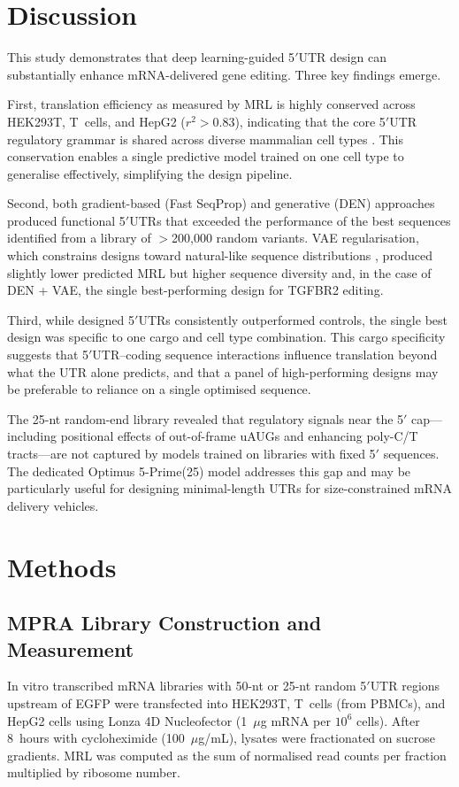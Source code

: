 \documentclass[11pt]{article}
\begin{document}
\section{Discussion}

This study demonstrates that deep learning-guided 5$'$UTR design can substantially enhance mRNA-delivered gene editing. Three key findings emerge.

First, translation efficiency as measured by MRL is highly conserved across HEK293T, T~cells, and HepG2 ($r^2 > 0.83$), indicating that the core 5$'$UTR regulatory grammar is shared across diverse mammalian cell types \citep{leppek2018functional, jackson2010mechanism}. This conservation enables a single predictive model trained on one cell type to generalise effectively, simplifying the design pipeline.

Second, both gradient-based (Fast SeqProp) and generative (DEN) approaches \citep{linder2020fast, bogdanovich2019deep} produced functional 5$'$UTRs that exceeded the performance of the best sequences identified from a library of $>$200,000 random variants. VAE regularisation, which constrains designs toward natural-like sequence distributions \citep{kingma2014auto}, produced slightly lower predicted MRL but higher sequence diversity and, in the case of DEN + VAE, the single best-performing design for TGFBR2 editing.

Third, while designed 5$'$UTRs consistently outperformed controls, the single best design was specific to one cargo and cell type combination. This cargo specificity suggests that 5$'$UTR--coding sequence interactions \citep{hinnebusch2014molecular} influence translation beyond what the UTR alone predicts, and that a panel of high-performing designs may be preferable to reliance on a single optimised sequence.

The 25-nt random-end library revealed that regulatory signals near the 5$'$ cap---including positional effects of out-of-frame uAUGs and enhancing poly-C/T tracts---are not captured by models trained on libraries with fixed 5$'$ sequences. The dedicated Optimus 5-Prime(25) model addresses this gap and may be particularly useful for designing minimal-length UTRs for size-constrained mRNA delivery vehicles.

\section{Methods}

\subsection{MPRA Library Construction and Measurement}
In vitro transcribed mRNA libraries with 50-nt or 25-nt random 5$'$UTR regions upstream of EGFP were transfected into HEK293T, T~cells (from PBMCs), and HepG2 cells using Lonza 4D Nucleofector (1~$\mu$g mRNA per $10^6$ cells). After 8~hours with cycloheximide (100~$\mu$g/mL), lysates were fractionated on sucrose gradients. MRL was computed as the sum of normalised read counts per fraction multiplied by ribosome number.
\end{document}
